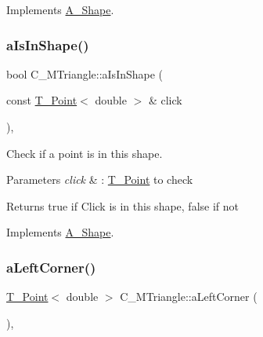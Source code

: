 Implements \hyperlink{classA__Shape_a24991f7667367b646cae75f60df22e28}{A\+\_\+\+Shape}.

\mbox{\label{classC__MTriangle_ae29e4f6608a0079507c6397b3dbef246}} 
\subsubsection{\texorpdfstring{a\+Is\+In\+Shape()}{aIsInShape()}}
{\footnotesize\ttfamily bool C\+\_\+\+M\+Triangle\+::a\+Is\+In\+Shape (\begin{DoxyParamCaption}\item[{const \hyperlink{classT__Point}{T\+\_\+\+Point}$<$ double $>$ \&}]{click }\end{DoxyParamCaption})\hspace{0.3cm}{\ttfamily [override]}, {\ttfamily [virtual]}}



Check if a point is in this shape. 


\begin{DoxyParams}{Parameters}
{\em click} & \+: \hyperlink{classT__Point}{T\+\_\+\+Point} to check \\
\hline
\end{DoxyParams}
\begin{DoxyReturn}{Returns}
true if Click is in this shape, false if not 
\end{DoxyReturn}


Implements \hyperlink{classA__Shape_a63f825cbc9780208d9a137f5c14917d0}{A\+\_\+\+Shape}.

\mbox{\label{classC__MTriangle_ad077fce026711bf0a25fc4c1cb83ecb9}} 
\subsubsection{\texorpdfstring{a\+Left\+Corner()}{aLeftCorner()}}
{\footnotesize\ttfamily \hyperlink{classT__Point}{T\+\_\+\+Point}$<$ double $>$ C\+\_\+\+M\+Triangle\+::a\+Left\+Corner (\begin{DoxyParamCaption}{ }\end{DoxyParamCaption})\hspace{0.3cm}{\ttfamily [override]}, {\ttfamily [virtual]}}



